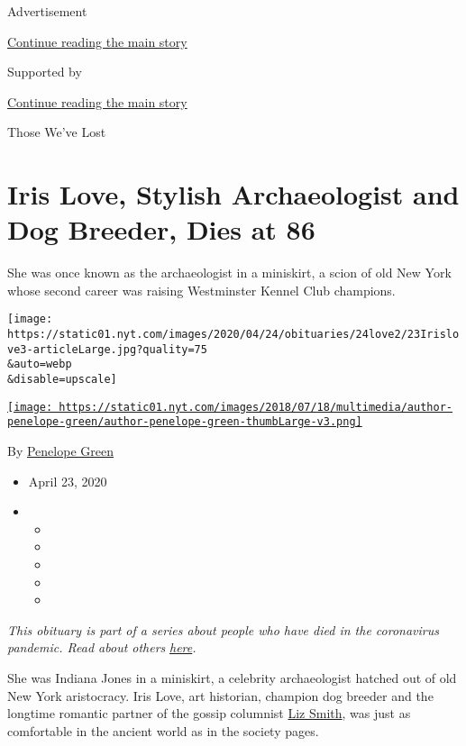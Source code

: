 Advertisement

\protect\hyperlink{after-top}{Continue reading the main story}

Supported by

\protect\hyperlink{after-sponsor}{Continue reading the main story}

Those We've Lost

\hypertarget{iris-love-stylish-archaeologist-and-dog-breeder-dies-at-86}{%
\section{Iris Love, Stylish Archaeologist and Dog Breeder, Dies at
86}\label{iris-love-stylish-archaeologist-and-dog-breeder-dies-at-86}}

She was once known as the archaeologist in a miniskirt, a scion of old
New York whose second career was raising Westminster Kennel Club
champions.

\texttt{[image: https://static01.nyt.com/images/2020/04/24/obituaries/24love2/23Irislove3-articleLarge.jpg?quality=75\\\&auto=webp\\\&disable=upscale]}

\href{https://www.nytimes.com/by/penelope-green}{\texttt{[image: https://static01.nyt.com/images/2018/07/18/multimedia/author-penelope-green/author-penelope-green-thumbLarge-v3.png]}}

By \href{https://www.nytimes.com/by/penelope-green}{Penelope Green}

\begin{itemize}
\item
  April 23, 2020
\item
  \begin{itemize}
  \item
  \item
  \item
  \item
  \item
  \end{itemize}
\end{itemize}

\emph{This obituary is part of a series about people who have died in
the coronavirus pandemic. Read about others}
\href{https://www.nytimes.com/series/people-who-have-died-of-the-coronavirus}{\emph{here}}\emph{.}

She was Indiana Jones in a miniskirt, a celebrity archaeologist hatched
out of old New York aristocracy. Iris Love, art historian, champion dog
breeder and the longtime romantic partner of the gossip columnist
\href{https://www.nytimes.com/2017/11/12/arts/liz-smith-dead.html}{Liz
Smith}, was just as comfortable in the ancient world as in the society
pages.

